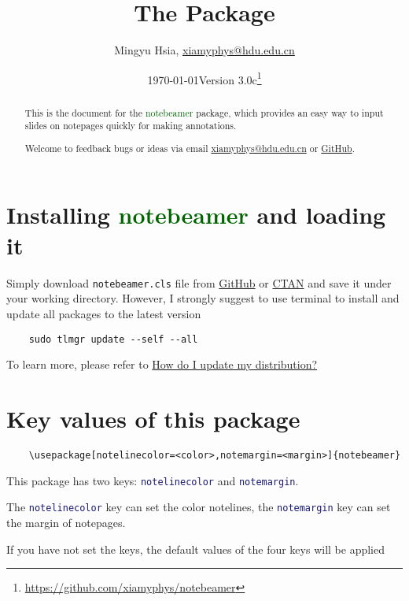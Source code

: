 \documentclass[11pt,svgnames]{article}
\title{\bfseries The \pkg{notebeamer} Package}
\author{Mingyu Hsia, \href{mailto:xiamyphys@hdu.edu.cn}{\ttfamily xiamyphys@hdu.edu.cn}}
\affil{Hangzhou Dianzi University}
\date{\today\quad Version 3.0c\thanks{\url{https://github.com/xiamyphys/notebeamer}}}
\def\pkg#1{\textcolor{DarkGreen}{\textsf{#1}}}
\def\cmd#1{\textcolor{MidnightBlue}{\texttt{\string#1}}}
\begin{document}
\maketitle

\begin{abstract}

This is the document for the \pkg{notebeamer} package, which provides an easy way to input slides on notepages quickly for making annotations.

Welcome to feedback bugs or ideas via email \href{mailto:xiamyphys@hdu.edu.cn}{\ttfamily xiamyphys@hdu.edu.cn} or \href{https://github.com/xiamyphys/notebeamer}{GitHub}.

\end{abstract}

\section{Installing \pkg{notebeamer} and loading it}

Simply download \verb|notebeamer.cls| file from \href{https://github.com/xiamyphys/notebeamer}{GitHub} or \href{https://ctan.org/pkg/notebeamer}{CTAN} and save it under your working directory. However, I strongly suggest to use terminal to install and update all packages to the latest version

\begin{verbatim}
    sudo tlmgr update --self --all
\end{verbatim}

To learn more, please refer to \href{https://tex.stackexchange.com/questions/55437/how-do-i-update-my-tex-distribution}{How do I update my  distribution?}

\section{Key values of this package}

\begin{verbatim}
    \usepackage[notelinecolor=<color>,notemargin=<margin>]{notebeamer}
\end{verbatim}

This package has two keys: \cmd{notelinecolor} and \cmd{notemargin}.

The \cmd{notelinecolor} key can set the color notelines, the \cmd{notemargin} key can set the margin of notepages.

If you have not set the keys, the default values of the four keys will be applied
\end{document}
